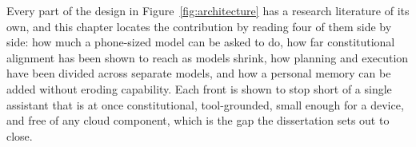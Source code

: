 %

Every part of the design in Figure~\ref{fig:architecture} has a research literature of its own, and this chapter locates the contribution by reading four of them side by side: how much a phone-sized model can be asked to do, how far constitutional alignment has been shown to reach as models shrink, how planning and execution have been divided across separate models, and how a personal memory can be added without eroding capability. Each front is shown to stop short of a single assistant that is at once constitutional, tool-grounded, small enough for a device, and free of any cloud component, which is the gap the dissertation sets out to close.

